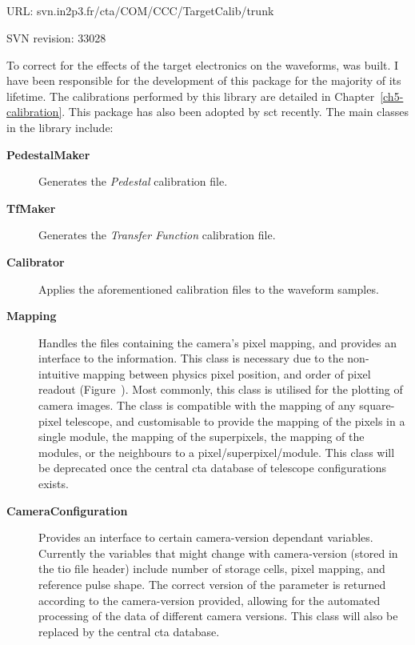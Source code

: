 \subsection{}
\vspace{-0.7em}
\noindent \hspace{\parindent} {\tiny URL: svn.in2p3.fr/cta/COM/CCC/TargetCalib/trunk \par}
\noindent \hspace{\parindent} {\tiny SVN revision: 33028 \par}

\noindent To correct for the effects of the \gls{target} electronics on the waveforms,  was built. I have been responsible for the development of this package for the majority of its lifetime. The calibrations performed by this library are detailed in Chapter~\ref{ch5-calibration}. This package has also been adopted by \gls{sct} recently. The main classes in the library include:

\lstset{language=C++}
\begin{description}
\item [\textbf{PedestalMaker}] Generates the \textit{Pedestal} calibration file.
\item [\textbf{TfMaker}] Generates the \textit{Transfer Function} calibration file.
\item [\textbf{Calibrator}] Applies the aforementioned calibration files to the waveform samples.
\item [\textbf{Mapping}] Handles the files containing the camera's pixel mapping, and provides an interface to the information. This class is necessary due to the non-intuitive mapping between physics pixel position, and order of pixel readout (Figure~). Most commonly, this class is utilised for the plotting of camera images. The class is compatible with the mapping of any square-pixel telescope, and customisable to provide the mapping of the pixels in a single module, the mapping of the superpixels, the mapping of the modules, or the neighbours to a pixel/superpixel/module. This class will be deprecated once the central \gls{cta} database of telescope configurations exists.
\item [\textbf{CameraConfiguration}] Provides an interface to certain camera-version dependant variables. Currently the variables that might change with camera-version (stored in the \gls{tio} file header) include number of storage cells, pixel mapping, and reference pulse shape. The correct version of the parameter is returned according to the camera-version provided, allowing for the automated processing of the data of different camera versions. This class will also be replaced by the central \gls{cta} database.
\end{description}

